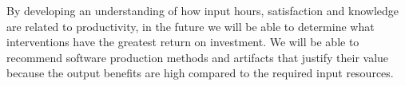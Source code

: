 \documentclass[sigconf, authorversion, nonacm]{acmart}
\begin{document}
By developing an understanding of how input hours, satisfaction and knowledge
are related to productivity, in the future we will be able to determine what
interventions have the greatest return on investment.  We will be able to
recommend software production methods and artifacts that justify their value
because the output benefits are high compared to the required input resources.  




\end{document}
